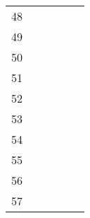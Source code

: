 \begin{table}[ht]
\begin{tabular}{c|lllll}
    48                       &                                          &                                           &                                                &                                    &                                      \\
    49                       &                                          &                                           &                                                &                                    &                                      \\
    50                       &                                          &                                           &                                                &                                    &                                      \\
    51                       &                                          &                                           &                                                &                                    &                                      \\
    52                       &                                          &                                           &                                                &                                    &                                      \\
    53                       &                                          &                                           &                                                &                                    &                                      \\
    54                       &                                          &                                           &                                                &                                    &                                      \\
    55                       &                                          &                                           &                                                &                                    &                                      \\
    56                       &                                          &                                           &                                                &                                    &                                      \\
    57                       &                                          &                                           &                                                &                                    &                                      \\

\end{tabular}
\end{table}
